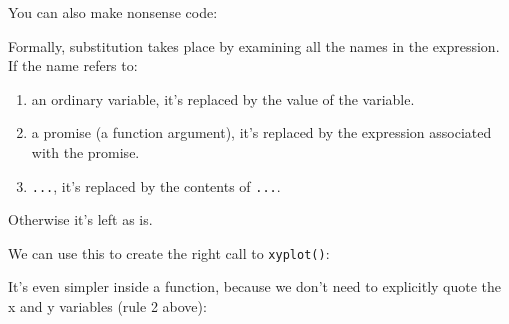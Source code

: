 You can also make nonsense code:

\begin{Shaded}
\begin{Highlighting}[]
\StringTok{ }\StringTok{ }\NormalTok{, }\NormalTok{(} \NormalTok{))}
\end{Highlighting}
\end{Shaded}

Formally, substitution takes place by examining all the names in the
expression. If the name refers to:

\begin{enumerate}
\def\labelenumi{\arabic{enumi}.}
\item
  an ordinary variable, it's replaced by the value of the variable.
\item
  a promise (a function argument), it's replaced by the expression
  associated with the promise.
\item
  \texttt{...}, it's replaced by the contents of \texttt{...}.
\end{enumerate}

Otherwise it's left as is.

We can use this to create the right call to \texttt{xyplot()}:

\begin{Shaded}
\begin{Highlighting}[]
\StringTok{ }
\StringTok{ }
\NormalTok{(}\StringTok{ } 
\end{Highlighting}
\end{Shaded}

It's even simpler inside a function, because we don't need to explicitly
quote the x and y variables (rule 2 above):

\begin{Shaded}
\begin{Highlighting}[]
\StringTok{ } 
  \NormalTok{(}\StringTok{ } 
\NormalTok{\}}
 
\end{Highlighting}
\end{Shaded}

